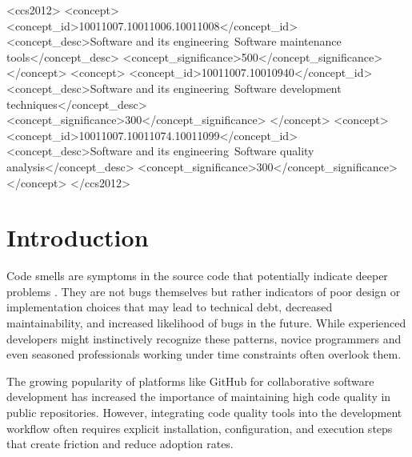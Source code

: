\documentclass[sigconf,screen]{acmart}
\begin{document}
\begin{CCSXML}
<ccs2012>
 <concept>
  <concept_id>10011007.10011006.10011008</concept_id>
  <concept_desc>Software and its engineering~Software maintenance tools</concept_desc>
  <concept_significance>500</concept_significance>
 </concept>
 <concept>
  <concept_id>10011007.10010940</concept_id>
  <concept_desc>Software and its engineering~Software development techniques</concept_desc>
  <concept_significance>300</concept_significance>
 </concept>
 <concept>
  <concept_id>10011007.10011074.10011099</concept_id>
  <concept_desc>Software and its engineering~Software quality analysis</concept_desc>
  <concept_significance>300</concept_significance>
 </concept>
</ccs2012>
\end{CCSXML}



\maketitle

\section{Introduction}

Code smells are symptoms in the source code that potentially indicate deeper problems \cite{fowler1999refactoring}. They are not bugs themselves but rather indicators of poor design or implementation choices that may lead to technical debt, decreased maintainability, and increased likelihood of bugs in the future. While experienced developers might instinctively recognize these patterns, novice programmers and even seasoned professionals working under time constraints often overlook them.

The growing popularity of platforms like GitHub for collaborative software development has increased the importance of maintaining high code quality in public repositories. However, integrating code quality tools into the development workflow often requires explicit installation, configuration, and execution steps that create friction and reduce adoption rates.
\end{document}
